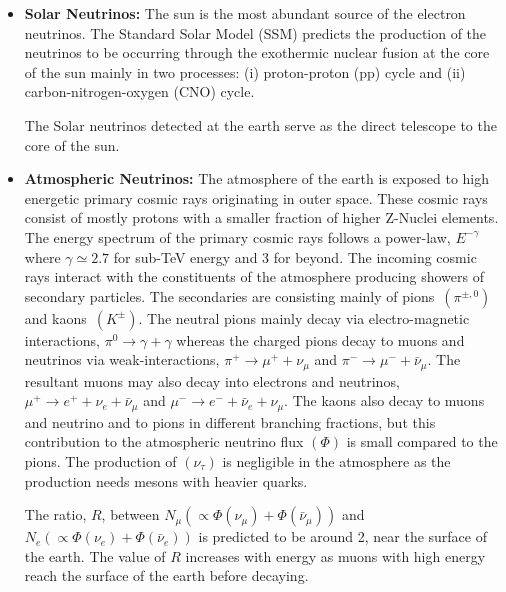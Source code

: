 \begin{itemize}
\item \textbf{Solar Neutrinos:} The sun is the most abundant source of
  the electron neutrinos. The Standard Solar Model (SSM)\cite{SSM}
  predicts the production of the neutrinos to be occurring through the
  exothermic nuclear fusion at the core of the sun mainly in two
  processes: (i) proton-proton (pp) cycle and
  (ii) carbon-nitrogen-oxygen (CNO) cycle.
  
  The Solar neutrinos detected at the earth serve as the direct
  telescope to the core of the sun.
  
\item \textbf{Atmospheric Neutrinos:} The atmosphere of the earth is
  exposed to high energetic primary cosmic rays originating in outer
  space. These cosmic rays consist of mostly protons with a smaller
  fraction of higher \mbox{Z-Nuclei} elements\cite{cosmic1}. The
  energy spectrum of the primary cosmic rays follows a power-law,
  $E^{-\gamma}$ where $\gamma\simeq 2.7$ for sub-TeV energy and 3 for
  beyond. The incoming cosmic rays interact with the constituents
  of the atmosphere producing showers of secondary particles.
  The secondaries are consisting mainly of
  \mbox{pions $\left(\pi^{\pm,0}\right)$} and
  \mbox{kaons $\left(K^{\pm}\right)$}. The neutral pions mainly decay
  via electro-magnetic interactions, $\pi^0 \rightarrow \gamma+\gamma$
  whereas the charged pions decay to muons and neutrinos via
  weak-interactions, $\pi^+ \rightarrow \mu^+ + \nu_{\mu}$ and
  $\pi^- \rightarrow \mu^- + \bar{\nu}_{\mu}$. The resultant muons may
  also decay into electrons and neutrinos,
  $\mu^+ \rightarrow e^+ + \nu_{e} + \bar{\nu}_{\mu}$ and
  $\mu^- \rightarrow e^- + \bar{\nu}_{e} + \nu_{\mu}$. The kaons also
  decay to muons and neutrino and to pions in different branching
  fractions, but this contribution to the atmospheric neutrino flux
  $\left(\Phi\right)$ is small compared to the pions. The production
  of $\left(\nu_{\tau}\right)$ is negligible in the atmosphere as the
  production needs mesons with heavier quarks.
  
  The ratio, $R$, between $N_{\mu}\left(\propto \Phi\left(\nu_{\mu}\right)+\Phi\left(\bar{\nu}_{\mu}\right)\right)$ and $N_{e}\left( \propto\Phi\left(\nu_{e}\right)+\Phi\left(\bar{\nu}_{e}\right)\right)$ is predicted to be around 2,
  near the surface of the earth. The value of $R$ increases with
  energy as muons with high energy reach the surface of the earth
  before decaying.
  

\end{itemize}
